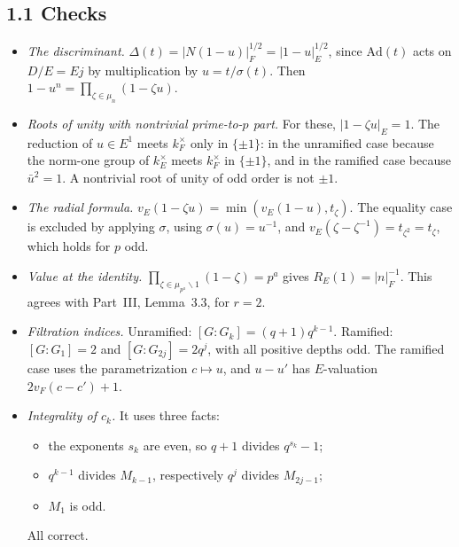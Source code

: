 \documentclass[11pt]{article}
\theoremstyle{plain}
\begin{document}
\subsection*{1.1 Checks}
\begin{itemize}
\item \emph{The discriminant.} $\Delta(t)=|N(1-u)|_F^{1/2}=|1-u|_E^{1/2}$,
since $\mathrm{Ad}(t)$ acts on $D/E=Ej$ by multiplication by
$u=t/\sigma(t)$. Then $1-u^n=\prod_{\zeta\in\mu_n}(1-\zeta u)$.
\item \emph{Roots of unity with nontrivial prime-to-$p$ part.} For these,
$|1-\zeta u|_E=1$. The reduction of $u\in E^1$ meets $k_F^\times$ only
in $\{\pm1\}$: in the unramified case because the norm-one group of
$k_E^\times$ meets $k_F^\times$ in $\{\pm1\}$, and in the ramified case
because $\bar u^2=1$. A nontrivial root of unity of odd order is not
$\pm1$.
\item \emph{The radial formula.} $v_E(1-\zeta u)=\min(v_E(1-u),t_\zeta)$. The equality case is
excluded by applying $\sigma$, using $\sigma(u)=u^{-1}$, and
$v_E(\zeta-\zeta^{-1})=t_{\zeta^2}=t_\zeta$, which holds for $p$ odd.
\item \emph{Value at the identity.} $\prod_{\zeta\in\mu_{p^a}\smallsetminus1}(1-\zeta)=p^a$
gives $R_E(1)=|n|_F^{-1}$. This agrees with Part~III, Lemma~3.3, for
$r=2$.
\item \emph{Filtration indices.} Unramified: $[G:G_k]=(q+1)q^{k-1}$.
Ramified: $[G:G_1]=2$ and $[G:G_{2j}]=2q^j$, with all positive depths
odd. The ramified case uses the parametrization $c\mapsto u$, and
$u-u'$ has $E$-valuation $2v_F(c-c')+1$.
\item \emph{Integrality of $c_k$.} It uses three facts:
\begin{itemize}
\item the exponents $s_k$ are even, so $q+1$ divides $q^{s_k}-1$;
\item $q^{k-1}$ divides $M_{k-1}$, respectively $q^j$ divides $M_{2j-1}$;
\item $M_1$ is odd.
\end{itemize}
All correct.
\end{itemize}
\end{document}
